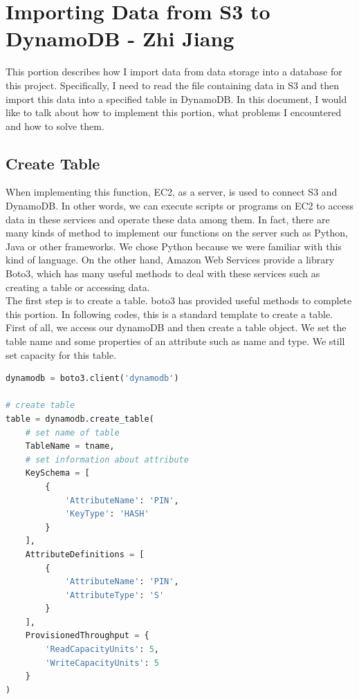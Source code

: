 \section{Importing Data from S3 to DynamoDB - Zhi Jiang}
This portion describes how I import data from data storage into a database for this project. Specifically, I need to read the file containing data in S3 and then import this data into a specified table in DynamoDB. In this document, I would like to talk about how to implement this portion, what problems I encountered and how to solve them.

\subsection{Create Table}
When implementing this function, EC2, as a server, is used to connect S3 and DynamoDB. In other words, we can execute scripts or programs on EC2 to access data in these services and operate these data among them. In fact, there are many kinds of method to implement our functions on the server such as Python, Java or other frameworks. We chose Python because we were familiar with this kind of language. On the other hand, Amazon Web Services provide a library Boto3, which has many useful methods to deal with these services such as creating a table or accessing data.\\

\noindent The first step is to create a table. boto3 has provided useful methods to complete this portion. In following codes, this is a standard template to create a table. First of all, we access our dynamoDB and then create a table object. We set the table name and some properties of an attribute such as name and type. We still set capacity for this table.\\ 
\begin{lstlisting}[language=Python, caption=create table]
dynamodb = boto3.client('dynamodb')

# create table 
table = dynamodb.create_table(
    # set name of table
    TableName = tname,
    # set information about attribute
    KeySchema = [
        {
            'AttributeName': 'PIN',
            'KeyType': 'HASH'
        }
    ],
    AttributeDefinitions = [
        {
            'AttributeName': 'PIN',
            'AttributeType': 'S'
        }
    ],
    ProvisionedThroughput = {
        'ReadCapacityUnits': 5,
        'WriteCapacityUnits': 5
    }
)
\end{lstlisting}

